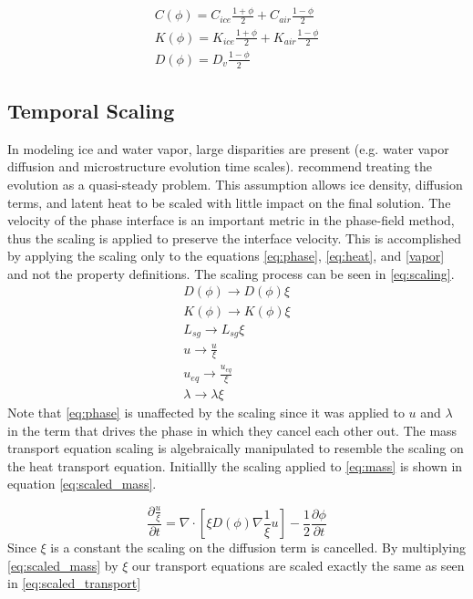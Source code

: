 \documentclass[twoside]{article}
\begin{document}
\begin{multicols}{2}
\begin{subequations} \label{eq:coefficients}
\begin{align}
	C(\phi) = C_{ice} \frac{1+\phi}{2} + C_{air} \frac{1-\phi}{2} \\
	K(\phi) = K_{ice} \frac{1+\phi}{2} + K_{air} \frac{1-\phi}{2} \\
	D(\phi) = D_{v} \frac{1-\phi}{2} \label{eq:diffusion_coefficient}
\end{align}
\end{subequations}

\subsection{Temporal Scaling}
In modeling ice and water vapor, large disparities are present (e.g. water vapor diffusion and microstructure evolution time scales). \cite{Plapp_2009} recommend treating the evolution as a quasi-steady problem. This assumption allows ice density, diffusion terms, and latent heat to be scaled with little impact on the final solution. The velocity of the phase interface is an important metric in the phase-field method, thus the scaling is applied to preserve the interface velocity. This is accomplished by applying the scaling only to the equations \eqref{eq:phase}, \eqref{eq:heat}, and \eqref{vapor} and not the property definitions. The scaling process can be seen in \eqref{eq:scaling}.
\begin{subequations} \label{eq:scaling}
\begin{align}
	D(\phi) \rightarrow D(\phi) \xi \\ 
	K(\phi) \rightarrow K(\phi)\xi  \\
	L_{sg} \rightarrow L_{sg}\xi  \\
	u \rightarrow \frac{u}{\xi}  \\
	u_{eq} \rightarrow \frac{u_{eq}}{\xi}  \\
	\lambda \rightarrow \lambda \xi
\end{align}
\end{subequations}
Note that \eqref{eq:phase} is unaffected by the scaling since it was applied to $u$ and $\lambda$ in the term that drives the phase in which they cancel each other out. The mass transport equation scaling is algebraically manipulated to resemble the scaling on the heat transport equation. Initiallly the scaling applied to \eqref{eq:mass} is shown in equation \eqref{eq:scaled_mass}. 

\begin{equation}
\frac{\partial \frac{u}{\xi}}{\partial t} = \nabla \cdot[ \xi D(\phi) \nabla \frac{1}{\xi}u] - \frac{ 1}{2}\frac{\partial \phi}{\partial t}
\end{equation}
Since $\xi$ is a constant the scaling on the diffusion term is cancelled. By multiplying \eqref{eq:scaled_mass} by $\xi$ our transport equations are scaled exactly the same as seen in \eqref{eq:scaled_transport}


\end{multicols}
\end{document}
